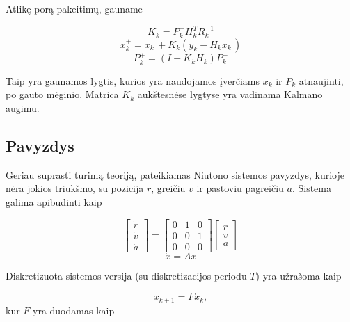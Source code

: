\documentclass[12pt, a4paper, lithuanian]{article}
\begin{document}
        Atlikę porą pakeitimų, gauname

        \begin{equation}
            K_k = P_{k}^+H_k^TR_k^{-1}
        \end{equation}
        \begin{equation}
            \bar{x}_k^+ = \bar{x}_k^- + K_k(y_k - H_k\bar{x}_k^-)
        \end{equation}
        \begin{equation}
            P_k^+ = (I-K_kH_k)P_{k}^-
        \end{equation}

        Taip yra gaunamos lygtis, kurios yra naudojamos įverčiams $\bar{x}_k$ ir $P_k$ atnaujinti, po gauto mėginio.
        Matrica $K_k$ aukštesnėse lygtyse yra vadinama Kalmano augimu.

        \subsection{Pavyzdys}

        Geriau suprasti turimą teoriją, pateikiamas Niutono sistemos pavyzdys, kurioje nėra jokios triukšmo, su pozicija $r$, greičiu $v$ ir pastoviu pagreičiu $a$.
        Sistema galima apibūdinti kaip

        \begin{equation}
            \begin{bmatrix} \dot{r} \\ \dot{v} \\ \dot{a} \end{bmatrix} = 
            \begin{bmatrix} 0 & 1 & 0 \\ 0 & 0 & 1 \\ 0 & 0 & 0 \end{bmatrix}
            \begin{bmatrix} r \\ v \\ a \end{bmatrix}
        \end{equation}
        \begin{equation}
            \dot{x} = Ax
        \end{equation}

        Diskretizuota sistemos versija (su diskretizacijos periodu $T$) yra užrašoma kaip\

        \begin{equation}
            x_{k+1} = Fx_k,
        \end{equation}
        kur $F$ yra duodamas kaip
\end{document}
